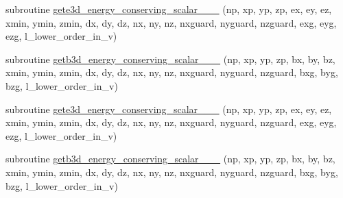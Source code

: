 \begin{DoxyCompactItemize}
\item 
subroutine \hyperlink{field__gathering_8_f90_a13e24ff5639b3dcf1e9cd8e51a1caf53}{gete3d\+\_\+energy\+\_\+conserving\+\_\+scalar\+\_\+\_\+\_} (np, xp, yp, zp, ex, ey, ez, xmin, ymin, zmin,                                                                                                                                                           dx, dy, dz, nx, ny, nz, nxguard, nyguard, nzguard,                                                                                                                                                   exg, eyg, ezg, l\+\_\+lower\+\_\+order\+\_\+in\+\_\+v)
\item 
subroutine \hyperlink{field__gathering_8_f90_a35b7fbf406b705b1a34472523046d1b1}{getb3d\+\_\+energy\+\_\+conserving\+\_\+scalar\+\_\+\_\+\_} (np, xp, yp, zp, bx, by, bz, xmin, ymin, zmin,                                                                                                                                                           dx, dy, dz, nx, ny, nz, nxguard, nyguard, nzguard,                                                                                                                                                   bxg, byg, bzg, l\+\_\+lower\+\_\+order\+\_\+in\+\_\+v)
\item 
subroutine \hyperlink{field__gathering_8_f90_aafcef6faa8aa6d61b950249a1285c258}{gete3d\+\_\+energy\+\_\+conserving\+\_\+scalar\+\_\+\_\+\_} (np, xp, yp, zp, ex, ey, ez, xmin, ymin, zmin,                                                                                                                                                           dx, dy, dz, nx, ny, nz, nxguard, nyguard, nzguard,                                                                                                                                                   exg, eyg, ezg, l\+\_\+lower\+\_\+order\+\_\+in\+\_\+v)
\item 
subroutine \hyperlink{field__gathering_8_f90_a521bd3732f843934943ef8a923d5da72}{getb3d\+\_\+energy\+\_\+conserving\+\_\+scalar\+\_\+\_\+\_} (np, xp, yp, zp, bx, by, bz, xmin, ymin, zmin,                                                                                                                                                           dx, dy, dz, nx, ny, nz, nxguard, nyguard, nzguard,                                                                                                                                                   bxg, byg, bzg, l\+\_\+lower\+\_\+order\+\_\+in\+\_\+v)
\item 

\end{DoxyCompactItemize}
